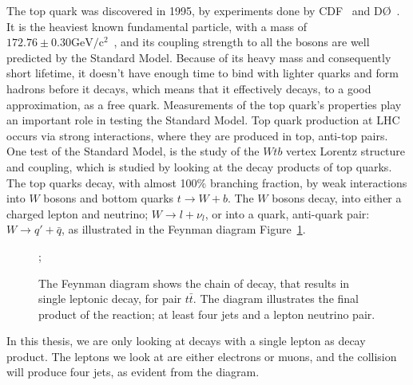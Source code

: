 \documentclass[12pt,a4paper]{article}
\numberwithin{equation}{section}
\begin{document}
The top quark was discovered in 1995, by experiments done by CDF~\cite{Abe_1995}
and DØ~\cite{Abachi_1995}. It is the heaviest known fundamental particle, with a
mass of $172.76 \pm 0.30 \mathrm{GeV/c^2}$~\cite{pdg}, and its coupling
strength to all the bosons are well predicted by the Standard Model. Because of
its heavy mass and consequently short lifetime, it doesn't have enough time to
bind with lighter quarks and form hadrons before it decays, which means that it
effectively decays, to a good approximation, as a free quark. Measurements of
the top quark's properties play an important role in testing the Standard
Model. Top quark production at LHC occurs via strong interactions, where they
are produced in top, anti-top pairs. One test of the Standard Model, is the
study of the $Wtb$ vertex Lorentz structure and coupling, which is studied by
looking at the decay products of top quarks. The top quarks decay, with almost
100\% branching fraction, by weak interactions into $W$ bosons and bottom quarks
$t \rightarrow W + b$. The $W$ bosons decay, into either a charged lepton and neutrino;
$W \rightarrow l + \nu_l$, or into a quark, anti-quark pair: $W \rightarrow q' + \bar{q}$, as
illustrated in the Feynman diagram Figure~\ref{fig:feynmandiagram}.\\

\begin{figure}[H]
  \begin{center}
    ;
  \end{center}
	\caption{The Feynman diagram shows the chain of decay, that results in single
    leptonic decay, for pair $t\bar t$. The diagram illustrates the final
    product of the reaction; at least four jets and a lepton neutrino
    pair.}\label{fig:feynmandiagram}
\end{figure}

In this thesis, we are only looking at decays with a single lepton as decay
product. The leptons we look at are either electrons or muons, and the collision
will produce four jets, as evident from the diagram.
\end{document}
